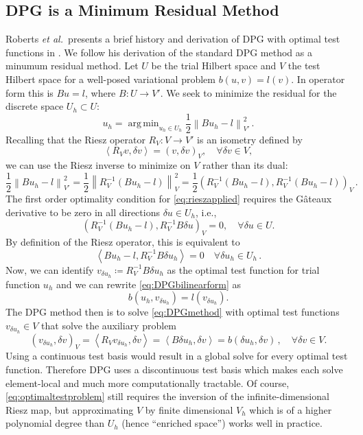 \documentclass[letterpaper]{article}
\DeclareMathOperator*{\argmin}{\arg\,\min}
\newcommand{\eqnref}[1]{\eqref{eq:#1}}
\newcommand{\norm}[1]{\left\| #1 \right\|}
\newcommand{\LRp}[1]{\left( #1 \right)}
\newcommand{\LRa}[1]{\left\langle #1 \right\rangle}
\def\etal{{\it et al.~}}
\begin{document}
\subsection{DPG is a Minimum Residual Method}
Roberts \etal presents a brief history and derivation of DPG with optimal test functions in
\cite{DPGStokes}. We follow his derivation of the standard DPG method as a
minumum residual method. Let $U$ be the trial Hilbert space and $V$ the test
Hilbert space for a well-posed variational problem $b(u,v)=l(v)$. In operator
form this is $Bu=l$, where $B:U\rightarrow V'$. We seek to minimize the
residual for the discrete space $U_h\subset U$:
\begin{equation}
u_h=\argmin_{u_h\in U_h}\frac{1}{2}\norm{Bu_h-l}^2_{V'}\,.
\label{minresidual}
\end{equation}
Recalling that the Riesz operator $R_V:V\rightarrow V'$ is an isometry defined
by
\[
\LRa{R_Vv,\delta v}=\LRp{v,\delta v}_V,\quad\forall\delta v\in V,
\]
we can use the Riesz inverse to minimize on $V$ rather than its dual:
\begin{equation}
\frac{1}{2}\norm{Bu_h-l}^2_{V'}=\frac{1}{2}\norm{R_V^{-1}(Bu_h-l)}^2_V
=\frac{1}{2}\LRp{R_V^{-1}(Bu_h-l),R_V^{-1}(Bu_h-l)}_V\,.
\label{eq:rieszapplied}
\end{equation}
The first order optimality condition for \eqnref{rieszapplied} requires
the G\^ateaux derivative to be zero in all directions $\delta u \in
U_h$, i.e.,
\[
\left(R_V^{-1}(Bu_h-l),R_V^{-1}B\delta u\right)_V = 0, \quad \forall \delta u \in U. 
\]
By definition of the Riesz operator, this is equivalent to
\begin{equation}
\LRa{Bu_h-l,R_V^{-1}B\delta u_h}=0\quad\forall\delta u_h\in U_h\,.
\label{eq:DPGbilinearform}
\end{equation}
Now, we can identify $v_{\delta u_h}\coloneqq R_V^{-1}B\delta u_h$ as the
optimal test function for trial function $u_h$ and we can rewrite
\eqnref{DPGbilinearform} as
\begin{equation}
b(u_h,v_{\delta u_h})=l(v_{\delta u_h}).
\label{eq:DPGmethod}
\end{equation}
The DPG method then is to solve \eqnref{DPGmethod} with optimal test functions
$v_{\delta u_h}\in V$ that solve the auxiliary problem
\begin{equation}
\LRp{v_{\delta u_h},\delta v}_V=\LRa{R_Vv_{\delta u_h},\delta v}
=\LRa{B\delta u_h,\delta v}=b(\delta u_h,\delta v)\,,\quad\forall\delta v\in V.
\label{eq:optimaltestproblem}
\end{equation}
Using a continuous test basis would result in a global solve for every optimal
test function. Therefore DPG uses a discontinuous test basis which makes each
solve element-local and much more computationally tractable. Of course,
\eqnref{optimaltestproblem} still requires the inversion of the
infinite-dimensional Riesz map, but approximating $V$ by finite
dimensional $V_h$ which is of a higher polynomial degree than $U_h$ (hence
``enriched space'') works well in practice.
\end{document}
